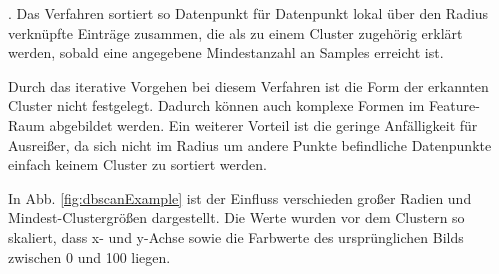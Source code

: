 \documentclass[
  12pt,
  openany]{book}
\begin{document}
. Das Verfahren sortiert so Datenpunkt für Datenpunkt lokal über den Radius verknüpfte Einträge zusammen, die als zu einem Cluster zugehörig erklärt werden, sobald eine angegebene Mindestanzahl an Samples erreicht ist.

Durch das iterative Vorgehen bei diesem Verfahren ist die Form der erkannten Cluster nicht festgelegt. Dadurch können auch komplexe Formen im Feature-Raum abgebildet werden. Ein weiterer Vorteil ist die geringe Anfälligkeit für Ausreißer, da sich nicht im Radius um andere Punkte befindliche Datenpunkte einfach keinem Cluster zu sortiert werden.

In Abb. \ref{fig:dbscanExample} ist der Einfluss verschieden großer Radien und Mindest-Clustergrößen dargestellt. Die Werte wurden vor dem Clustern so skaliert, dass x- und y-Achse sowie die Farbwerte des ursprünglichen Bilds zwischen 0 und 100 liegen.
\end{document}
